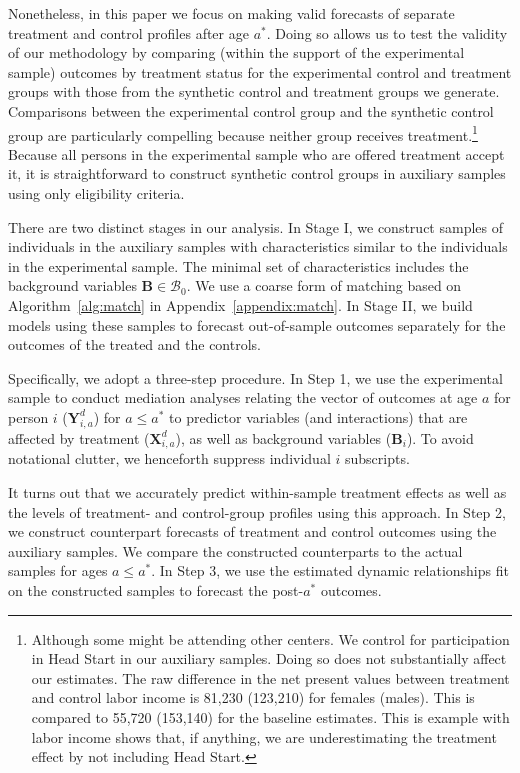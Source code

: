 Nonetheless, in this paper we focus on making valid forecasts of separate treatment and control profiles after age $a^*$. Doing so allows us to test the validity of our methodology by comparing (within the support of the experimental sample) outcomes by treatment status for the experimental control and treatment groups with those from the synthetic control and treatment groups we generate. Comparisons between the experimental control group and the synthetic control group are particularly compelling because neither group receives treatment.\footnote{Although some might be attending other centers. We control for participation in Head Start in our auxiliary samples. Doing so does not substantially affect our estimates. The raw difference in the net present values between treatment and control labor income is 81,230 (123,210) for females (males). This is compared to 55,720 (153,140) for the baseline estimates. This is example with labor income shows that, if anything, we are underestimating the treatment effect by not including Head Start.} Because all persons in the experimental sample who are offered treatment accept it, it is straightforward to construct synthetic control groups in auxiliary samples using only eligibility criteria.

There are two distinct stages in our analysis. In Stage I, we construct samples of individuals in the auxiliary samples with characteristics similar to the individuals in the experimental sample. The minimal set of characteristics includes the background variables $\bm{B} \in \mathcal{B}_0$. We use a coarse form of matching based on Algorithm~\ref{alg:match} in  Appendix~\ref{appendix:match}. In Stage II, we build models using these samples to forecast out-of-sample outcomes separately for the outcomes of the treated and the controls.

Specifically, we adopt a three-step procedure. In Step 1, we use the experimental sample to conduct mediation analyses relating the vector of outcomes at age $a$ for person $i$ ($\bm{Y}^{d}_{i,a}$) for $a\leq a^*$ to predictor variables (and interactions) that are affected by treatment ($\bm{X}^{d}_{i,a}$), as well as background variables ($\bm{B}_i$). To avoid notational clutter, we henceforth suppress individual $i$ subscripts.

It turns out that we accurately predict within-sample treatment effects as well as the levels of treatment- and control-group profiles using this approach. In Step 2, we construct counterpart forecasts of treatment and control outcomes using the auxiliary samples. We compare the constructed counterparts to the actual samples for ages $a \leq a^\ast$. In Step 3, we use the estimated dynamic relationships fit on the constructed samples to forecast the post-$a^{\ast}$ outcomes.

